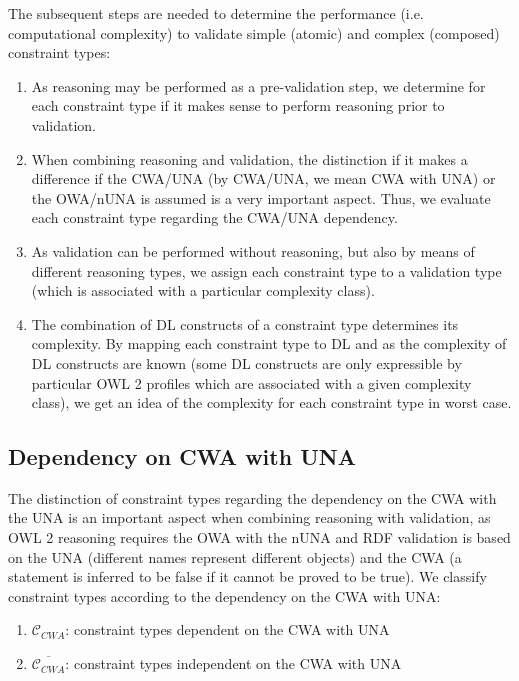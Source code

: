 \documentclass{llncs}
\newcommand{\er}[1]{\todo[size=\small, color=red!40]{\textbf{Erman:} #1}}
\begin{document}
The subsequent steps are needed to determine the performance (i.e. computational complexity) to validate simple (atomic) and complex (composed) constraint types:
\begin{enumerate}
	\item As reasoning may be performed as a pre-validation step, we determine for each constraint type if it makes sense to perform reasoning prior to validation.
	\item When combining reasoning and validation, the distinction if it makes a difference if the CWA/UNA (by CWA/UNA, we mean CWA with UNA) or the OWA/nUNA is assumed is a very important aspect. Thus, we evaluate each constraint type regarding the CWA/UNA dependency.
	\item As validation can be performed without reasoning, but also by means of different reasoning types, we assign each constraint type to a validation type (which is associated with a particular complexity class).
	\item The combination of DL constructs of a constraint type determines its complexity. By mapping each constraint type to DL and as the complexity of DL constructs are known (some DL constructs are only expressible by particular OWL 2 profiles which are associated with a given complexity class), we get an idea of the complexity for each constraint type in worst case.
\end{enumerate}

\subsection{Dependency on CWA with UNA}

The distinction of constraint types regarding the dependency on the CWA with the UNA is an important aspect when combining reasoning with validation,
as OWL 2 reasoning requires the OWA with the nUNA and RDF validation is based on the UNA (different names represent different objects) and
the CWA (a statement is inferred to be false if it cannot be proved to be true).
We classify constraint types according to the dependency on the CWA with UNA:
\begin{enumerate}
	\item $\mathcal{C}_{CWA}$: constraint types dependent on the CWA with UNA
	\item $\overline{\mathcal{C}_{CWA}}$: constraint types independent on the CWA with UNA
\end{enumerate}
\end{document}
